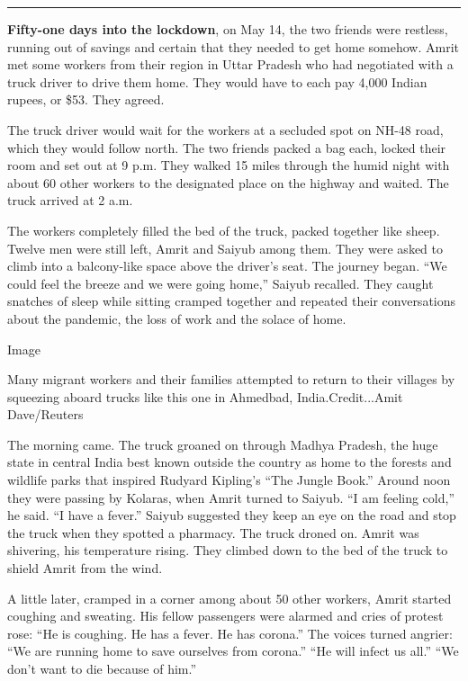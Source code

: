 \begin{center}\rule{0.5\linewidth}{\linethickness}\end{center}

\textbf{Fifty-one days into the lockdown}, on May 14, the two friends
were restless, running out of savings and certain that they needed to
get home somehow. Amrit met some workers from their region in Uttar
Pradesh who had negotiated with a truck driver to drive them home. They
would have to each pay 4,000 Indian rupees, or \$53. They agreed.

The truck driver would wait for the workers at a secluded spot on NH-48
road, which they would follow north. The two friends packed a bag each,
locked their room and set out at 9 p.m. They walked 15 miles through the
humid night with about 60 other workers to the designated place on the
highway and waited. The truck arrived at 2 a.m.

The workers completely filled the bed of the truck, packed together like
sheep. Twelve men were still left, Amrit and Saiyub among them. They
were asked to climb into a balcony-like space above the driver's seat.
The journey began. ``We could feel the breeze and we were going home,''
Saiyub recalled. They caught snatches of sleep while sitting cramped
together and repeated their conversations about the pandemic, the loss
of work and the solace of home.

Image

Many migrant workers and their families attempted to return to their
villages by squeezing aboard trucks like this one in Ahmedbad,
India.Credit...Amit Dave/Reuters

The morning came. The truck groaned on through Madhya Pradesh, the huge
state in central India best known outside the country as home to the
forests and wildlife parks that inspired Rudyard Kipling's ``The Jungle
Book.'' Around noon they were passing by Kolaras, when Amrit turned to
Saiyub. ``I am feeling cold,'' he said. ``I have a fever.'' Saiyub
suggested they keep an eye on the road and stop the truck when they
spotted a pharmacy. The truck droned on. Amrit was shivering, his
temperature rising. They climbed down to the bed of the truck to shield
Amrit from the wind.

A little later, cramped in a corner among about 50 other workers, Amrit
started coughing and sweating. His fellow passengers were alarmed and
cries of protest rose: ``He is coughing. He has a fever. He has
corona.'' The voices turned angrier: ``We are running home to save
ourselves from corona.'' ``He will infect us all.'' ``We don't want to
die because of him.''

